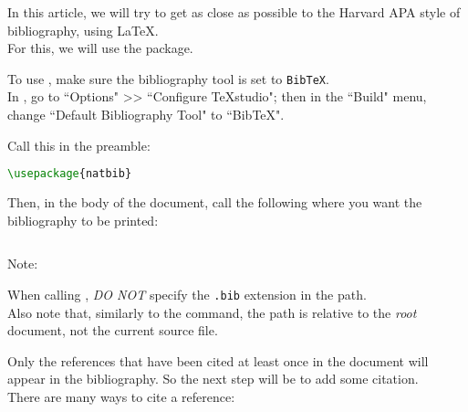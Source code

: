 In this article, we will try to get as close as possible to the Harvard APA style of bibliography, using \LaTeX. \\


For this, we will use the  package.


\begin{note}
To use , make sure the bibliography tool is set to  \texttt{BibTeX}. \\
	
In \TeXstudio, go to ``Options" >> ``Configure TeXstudio"; then in the ``Build" menu, change ``Default Bibliography Tool" to ``BibTeX".
\end{note}


Call this in the preamble:
\begin{lstlisting}[language=tex]
\usepackage{natbib}
\end{lstlisting}

\bigskip


Then, in the body of the document, call the following where you want the bibliography to be printed:

\begin{lstlisting}[language=tex]


\end{lstlisting}



Note:

\begin{note}
When calling , \emph{DO NOT} specify the \texttt{.bib} extension in the path. \\

Also note that, similarly to the  command, the path is relative to the \emph{root} document, not the current source file.
\end{note}

\medskip

Only the references that have been cited at least once in the document will appear in the bibliography. So the next step will be to add some citation. \\


There are many ways to cite a reference:

\newcommand{\bibid}{\texttt{\{id\}}}

